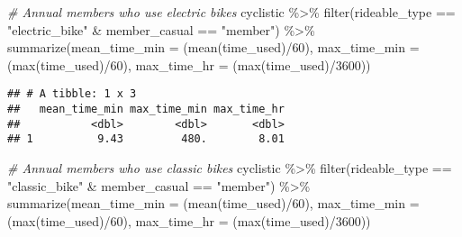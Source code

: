 \documentclass[
]{article}
\newenvironment{Shaded}{\begin{snugshade}}{\end{snugshade}}
\newcommand{\AttributeTok}[1]{\textcolor[rgb]{0.77,0.63,0.00}{#1}}
\newcommand{\CommentTok}[1]{\textcolor[rgb]{0.56,0.35,0.01}{\textit{#1}}}
\newcommand{\DecValTok}[1]{\textcolor[rgb]{0.00,0.00,0.81}{#1}}
\newcommand{\FunctionTok}[1]{\textcolor[rgb]{0.00,0.00,0.00}{#1}}
\newcommand{\NormalTok}[1]{#1}
\newcommand{\SpecialCharTok}[1]{\textcolor[rgb]{0.00,0.00,0.00}{#1}}
\newcommand{\StringTok}[1]{\textcolor[rgb]{0.31,0.60,0.02}{#1}}
\begin{document}
\begin{Shaded}
\begin{Highlighting}[]
\CommentTok{\# Annual members who use electric bikes}
\NormalTok{cyclistic }\SpecialCharTok{\%\textgreater{}\%} \FunctionTok{filter}\NormalTok{(rideable\_type }\SpecialCharTok{==} \StringTok{"electric\_bike"} \SpecialCharTok{\&}\NormalTok{ member\_casual }\SpecialCharTok{==} \StringTok{"member"}\NormalTok{) }\SpecialCharTok{\%\textgreater{}\%}
                                                    \FunctionTok{summarize}\NormalTok{(}\AttributeTok{mean\_time\_min =}\NormalTok{ (}\FunctionTok{mean}\NormalTok{(time\_used)}\SpecialCharTok{/}\DecValTok{60}\NormalTok{),}
                                                              \AttributeTok{max\_time\_min =}\NormalTok{ (}\FunctionTok{max}\NormalTok{(time\_used)}\SpecialCharTok{/}\DecValTok{60}\NormalTok{),}
                                                              \AttributeTok{max\_time\_hr =}\NormalTok{ (}\FunctionTok{max}\NormalTok{(time\_used)}\SpecialCharTok{/}\DecValTok{3600}\NormalTok{))}
\end{Highlighting}
\end{Shaded}

\begin{verbatim}
## # A tibble: 1 x 3
##   mean_time_min max_time_min max_time_hr
##           <dbl>        <dbl>       <dbl>
## 1          9.43         480.        8.01
\end{verbatim}

\begin{Shaded}
\begin{Highlighting}[]
\CommentTok{\# Annual members who use classic bikes}
\NormalTok{cyclistic }\SpecialCharTok{\%\textgreater{}\%} \FunctionTok{filter}\NormalTok{(rideable\_type }\SpecialCharTok{==} \StringTok{"classic\_bike"} \SpecialCharTok{\&}\NormalTok{ member\_casual }\SpecialCharTok{==} \StringTok{"member"}\NormalTok{) }\SpecialCharTok{\%\textgreater{}\%} 
                                                    \FunctionTok{summarize}\NormalTok{(}\AttributeTok{mean\_time\_min =}\NormalTok{ (}\FunctionTok{mean}\NormalTok{(time\_used)}\SpecialCharTok{/}\DecValTok{60}\NormalTok{),}
                                                              \AttributeTok{max\_time\_min =}\NormalTok{ (}\FunctionTok{max}\NormalTok{(time\_used)}\SpecialCharTok{/}\DecValTok{60}\NormalTok{),}
                                                              \AttributeTok{max\_time\_hr =}\NormalTok{ (}\FunctionTok{max}\NormalTok{(time\_used)}\SpecialCharTok{/}\DecValTok{3600}\NormalTok{))}
\end{Highlighting}
\end{Shaded}
\end{document}
